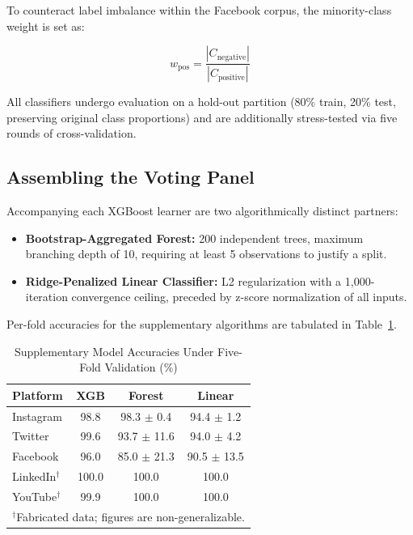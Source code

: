 \documentclass[conference]{IEEEtran}
\begin{document}
To counteract label imbalance within the Facebook corpus, the minority-class weight is set as:

\begin{equation}
w_{\text{pos}} = \frac{|C_{\text{negative}}|}{|C_{\text{positive}}|}
\end{equation}

All classifiers undergo evaluation on a hold-out partition (80\% train, 20\% test, preserving original class proportions) and are additionally stress-tested via five rounds of cross-validation.

\subsection{Assembling the Voting Panel}

Accompanying each XGBoost learner are two algorithmically distinct partners:

\begin{itemize}
    \item \textbf{Bootstrap-Aggregated Forest:} 200 independent trees, maximum branching depth of 10, requiring at least 5 observations to justify a split.
    \item \textbf{Ridge-Penalized Linear Classifier:} L2 regularization with a 1{,}000-iteration convergence ceiling, preceded by z-score normalization of all inputs.
\end{itemize}

Per-fold accuracies for the supplementary algorithms are tabulated in Table~\ref{tab:ensemble_cv}.

\begin{table}[htbp]
\caption{Supplementary Model Accuracies Under Five-Fold Validation (\%)}
\label{tab:ensemble_cv}
\centering
\begin{tabular}{lccc}
\toprule
\textbf{Platform} & \textbf{XGB} & \textbf{Forest} & \textbf{Linear} \\
\midrule
Instagram & 98.8 & 98.3 $\pm$ 0.4 & 94.4 $\pm$ 1.2 \\
Twitter & 99.6 & 93.7 $\pm$ 11.6 & 94.0 $\pm$ 4.2 \\
Facebook & 96.0 & 85.0 $\pm$ 21.3 & 90.5 $\pm$ 13.5 \\
LinkedIn$^\dagger$ & 100.0 & 100.0 & 100.0 \\
YouTube$^\dagger$ & 99.9 & 100.0 & 100.0 \\
\bottomrule
\multicolumn{4}{l}{\footnotesize $^\dagger$Fabricated data; figures are non-generalizable.}
\end{tabular}
\end{table}
\end{document}

